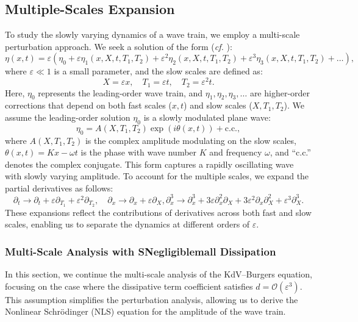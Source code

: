 \documentclass[alpha-refs, 12pt]{wiley-article}
\renewcommand{\O}{\mathcal{O}}
\newcommand{\eps}{\varepsilon}
\begin{document}
\subsection*{Multiple-Scales Expansion}

To study the slowly varying dynamics of a wave train, we employ a multi-scale perturbation approach. We seek a solution of the form (\emph{cf.} \cite{Dias2005}):
\begin{equation}
  \label{eq:ansatz}
  \eta(x,t) = \eps \left( \eta_0 + \eps \eta_1(x, X, t, T_1, T_2) + \eps^2 \eta_2(x, X, t, T_1, T_2) + \eps^3 \eta_3(x, X, t, T_1, T_2) + \dots \right),
\end{equation}
where $\eps \ll 1$ is a small parameter, and the slow scales are defined as:
\[
  X = \eps x, \quad T_1 = \eps t, \quad T_2 = \eps^2 t.
\]
Here, $\eta_0$ represents the leading-order wave train, and $\eta_1, \eta_2, \eta_3, \dots$ are higher-order corrections that depend on both fast scales ($x, t$) and slow scales ($X, T_1, T_2$). We assume the leading-order solution $\eta_0$ is a slowly modulated plane wave:
\begin{equation}\label{eq:wave_train}
  \eta_0 = A(X, T_1, T_2) \exp(i \theta(x, t)) + \text{c.c.},
\end{equation}
where $A(X, T_1, T_2)$ is the complex amplitude modulating on the slow scales, $\theta(x, t) = K x - \omega t$ is the phase with wave number $K$ and frequency $\omega$, and ``c.c.'' denotes the complex conjugate. This form captures a rapidly oscillating wave with slowly varying amplitude. To account for the multiple scales, we expand the partial derivatives as follows:
\begin{equation*}\label{eq:derivative_expansion}
  \partial_t \rightarrow \partial_t + \eps \partial_{T_1} + \eps^2 \partial_{T_2}, \quad \partial_x \rightarrow \partial_x + \eps \partial_X, \partial_x^3 \rightarrow \partial_x^3 + 3 \eps \partial_x^2 \partial_X + 3 \eps^2 \partial_x \partial_X^2 + \eps^3 \partial_X^3.
\end{equation*}
These expansions reflect the contributions of derivatives across both fast and slow scales, enabling us to separate the dynamics at different orders of $\eps$.

\subsubsection{Multi-Scale Analysis with SNegligiblemall Dissipation}

In this section, we continue the multi-scale analysis of the KdV--Burgers equation, focusing on the case where the dissipative term coefficient satisfies $d = \O(\eps^3)$. This assumption simplifies the perturbation analysis, allowing us to derive the Nonlinear Schr\"odinger (NLS) equation for the amplitude of the wave train.
\end{document}
